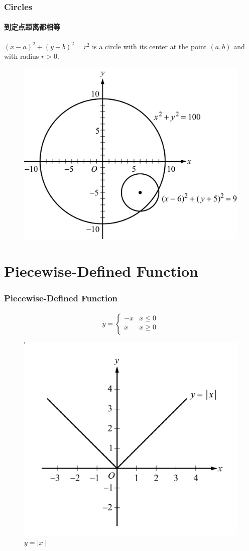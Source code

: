 \documentclass[
	11pt, %
	handout,
]{beamer}
\begin{document}
\begin{frame}
	\frametitle{Circles}
	\framesubtitle{到定点距离都相等}
	\begin{theorem}[圆]
		$(x - a)^2 + (y - b)^2 = r^2$ is a circle with its center at the point $(a, b)$ and with radius $r >0$.
	\end{theorem}

		\begin{figure}
		\includegraphics[width=0.6\linewidth]{Circles.jpg}
	\end{figure}
\end{frame}



\section{Piecewise-Defined Function}



\begin{frame}
	\frametitle{Piecewise-Defined Function}
	\framesubtitle{}

\[y= \begin{cases} 
      -x & x\leq 0 \\
      x &  x\geq 0 \\
   \end{cases}
\]
	\begin{figure}
		\includegraphics[width=0.5\linewidth]{Piecewise_Defined_Function.png}
		\caption{$y = \mid x \mid$}
	\end{figure}

\end{frame}
\end{document}
